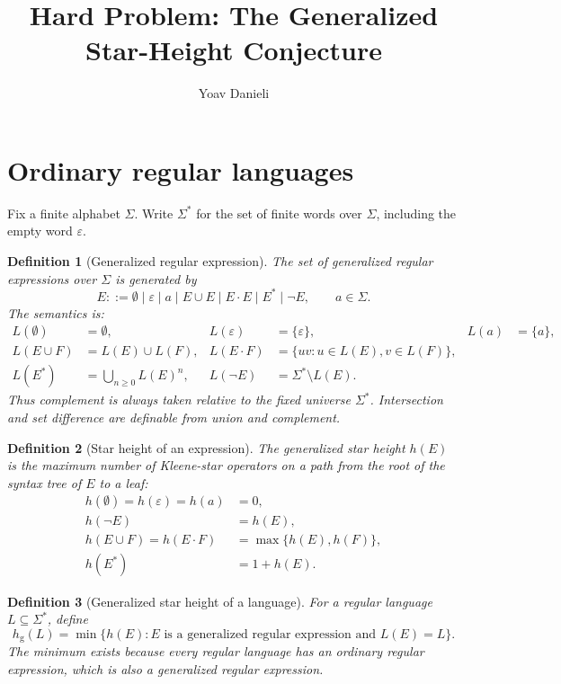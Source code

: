 \documentclass[11pt]{article}
\title{Hard Problem: The Generalized Star-Height Conjecture}
\author{Yoav Danieli}
\date{}
\newtheorem{definition}{Definition}
\begin{document}
\maketitle

\section{Ordinary regular languages}

Fix a finite alphabet $\Sigma$.  Write $\Sigma^*$ for the set of finite words
over $\Sigma$, including the empty word $\varepsilon$.

\begin{definition}[Generalized regular expression]
The set of generalized regular expressions over $\Sigma$ is generated by
\[
 E ::= \emptyset\mid\varepsilon\mid a
 \mid E\cup E\mid E\cdot E\mid E^*\mid \neg E,
 \qquad a\in\Sigma.
\]
The semantics is:
\[
\begin{aligned}
L(\emptyset)&=\emptyset,&
L(\varepsilon)&=\{\varepsilon\},&
L(a)&=\{a\},\\
L(E\cup F)&=L(E)\cup L(F),&
L(E\cdot F)&=\{uv:u\in L(E),v\in L(F)\},\\
L(E^*)&=\bigcup_{n\geq0}L(E)^n,&
L(\neg E)&=\Sigma^*\setminus L(E).
\end{aligned}
\]
Thus complement is always taken relative to the fixed universe $\Sigma^*$.
Intersection and set difference are definable from union and complement.
\end{definition}

\begin{definition}[Star height of an expression]
The generalized star height $h(E)$ is the maximum number of Kleene-star
operators on a path from the root of the syntax tree of $E$ to a leaf:
\[
\begin{aligned}
h(\emptyset)=h(\varepsilon)=h(a)&=0,\\
h(\neg E)&=h(E),\\
h(E\cup F)=h(E\cdot F)&=\max\{h(E),h(F)\},\\
h(E^*)&=1+h(E).
\end{aligned}
\]
\end{definition}

\begin{definition}[Generalized star height of a language]
For a regular language $L\subseteq\Sigma^*$, define
\[
 h_{\mathrm g}(L)
 =
 \min\{h(E):E\text{ is a generalized regular expression and }L(E)=L\}.
\]
The minimum exists because every regular language has an ordinary regular
expression, which is also a generalized regular expression.
\end{definition}
\end{document}
